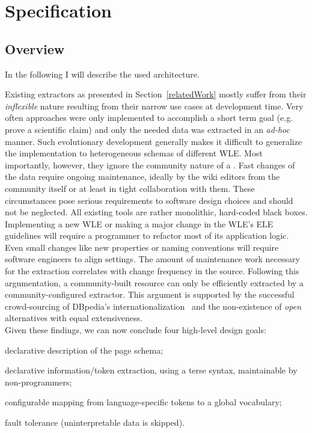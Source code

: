 \section{Specification}
\label{sec:specification}
\subsection{Overview}
In the following I will describe the used architecture. 

Existing extractors as presented in Section~\ref{relatedWork} mostly suffer from their \textit{inflexible} nature resulting from their narrow use cases at development time. 
Very often approaches were only implemented to accomplish a short term goal (e.g. prove a scientific claim) and only the needed data was extracted in an \emph{ad-hoc} manner. 
Such evolutionary development generally makes it difficult to generalize the implementation to heterogeneous schemas of different WLE.
Most importantly, however, they ignore the community nature of a \wik. 
Fast changes of the data require ongoing maintenance, ideally by the wiki editors from the community itself or at least in tight collaboration with them.
These circumstances pose serious requirements to software design choices and should not be neglected. 
All existing tools are rather monolithic, hard-coded black boxes. 
Implementing a new WLE or making a major change in the WLE's ELE guidelines will require a programmer to refactor most of its application logic. 
Even small changes like new properties or naming conventions will require software engineers to align settings. 
The amount of maintenance work necessary for the extraction correlates with change frequency in the source. 
Following this argumentation, a community-built resource can only be efficiently extracted by a community-configured extractor. 
This argument is supported by the successful crowd-sourcing of DBpedia's internationalization~\cite{Kontokostas2012}  and the non-existence of \textit{open} alternatives with equal extensiveness.\\
Given these findings, we can now conclude four high-level design goals:
\begin{compactitem}
\item declarative description of the page schema;
\item declarative information/token extraction, using a terse syntax, maintainable by non-programmers;
\item configurable mapping from language-specific tokens to a global vocabulary;
\item fault tolerance (uninterpretable data is skipped).
\end{compactitem}

